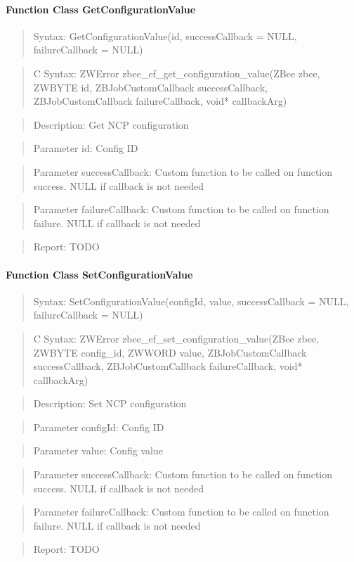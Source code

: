 \paragraph{Function Class GetConfigurationValue}
\begin{quote}Syntax: GetConfigurationValue(id, successCallback = NULL, failureCallback = NULL)\end{quote}
\begin{quote}C Syntax: ZWError zbee\_ef\_get\_configuration\_value(ZBee zbee, ZWBYTE id, ZBJobCustomCallback successCallback, ZBJobCustomCallback failureCallback, void* callbackArg)\end{quote}
\begin{quote}Description: Get NCP configuration\end{quote}
\begin{quote}Parameter id: Config ID\end{quote}
\begin{quote}Parameter successCallback: Custom function to be called on function success. NULL if callback is not needed\end{quote}
\begin{quote}Parameter failureCallback: Custom function to be called on function failure. NULL if callback is not needed\end{quote}
\begin{quote}Report: TODO\end{quote}

\paragraph{Function Class SetConfigurationValue}
\begin{quote}Syntax: SetConfigurationValue(configId, value, successCallback = NULL, failureCallback = NULL)\end{quote}
\begin{quote}C Syntax: ZWError zbee\_ef\_set\_configuration\_value(ZBee zbee, ZWBYTE config\_id, ZWWORD value, ZBJobCustomCallback successCallback, ZBJobCustomCallback failureCallback, void* callbackArg)\end{quote}
\begin{quote}Description: Set NCP configuration\end{quote}
\begin{quote}Parameter configId: Config ID\end{quote}
\begin{quote}Parameter value: Config value\end{quote}
\begin{quote}Parameter successCallback: Custom function to be called on function success. NULL if callback is not needed\end{quote}
\begin{quote}Parameter failureCallback: Custom function to be called on function failure. NULL if callback is not needed\end{quote}
\begin{quote}Report: TODO\end{quote}

